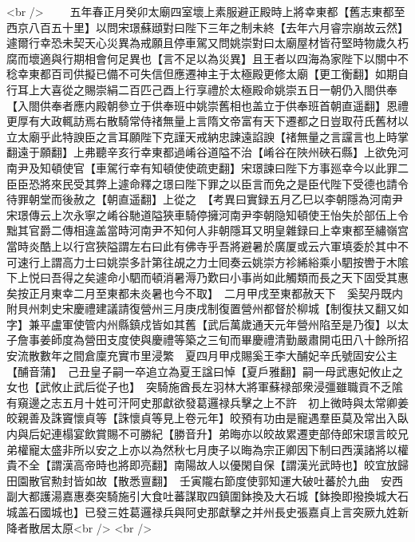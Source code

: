 <br />
　　五年春正月癸卯太廟四室壞上素服避正殿時上將幸東都【舊志東都至西京八百五十里】以問宋璟蘇頲對曰陛下三年之制未終【去年六月睿宗崩故云然】遽爾行幸恐未契天心災異為戒願且停車駕又問姚崇對曰太廟屋材皆苻堅時物歲久朽腐而壞適與行期相會何足異也【言不足以為災異】且王者以四海為家陛下以關中不稔幸東都百司供擬已備不可失信但應遷神主于太極殿更修太廟【更工衡翻】如期自行耳上大喜從之賜崇絹二百匹己酉上行享禮於太極殿命姚崇五日一朝仍入閤供奉【入閤供奉者應内殿朝參立于供奉班中姚崇舊相也盖立于供奉班首朝直遥翻】恩禮更厚有大政輒訪焉右散騎常侍禇無量上言隋文帝富有天下遷都之日豈取苻氏舊材以立太廟乎此特諛臣之言耳願陛下克謹天戒納忠諫遠諂諛【禇無量之言讜言也上時掌翻遠于願翻】上弗聽辛亥行幸東都過崤谷道隘不治【崤谷在陜州硤石縣】上欲免河南尹及知頓使官【車駕行幸有知頓使使疏吏翻】宋璟諫曰陛下方事廵幸今以此罪二臣臣恐將來民受其弊上遽命釋之璟曰陛下罪之以臣言而免之是臣代陛下受德也請令待罪朝堂而後赦之【朝直遥翻】上從之　【考異曰實録五月乙巳以李朝隱為河南尹宋璟傳云上次永寧之崤谷馳道隘狹車騎停擁河南尹李朝隐知頓使王怡失於部伍上令黜其官爵二傳相違盖當時河南尹不知何人非朝隱耳又明皇雜録曰上幸東都至繡嶺宫當時炎酷上以行宫狹隘謂左右曰此有佛寺乎吾將避暑於廣厦或云六軍填委於其中不可速行上謂高力士曰姚崇多計第往覘之力士囘奏云姚崇方袗絺綌乘小駟按轡于木隂下上悦曰吾得之矣遽命小駟而頓消暑溽乃歎曰小事尚如此觸類而長之天下固受其惠矣按正月東幸二月至東都未炎暑也今不取】　二月甲戌至東都赦天下　奚契丹既内附貝州刺史宋慶禮建議請復營州三月庚戌制復置營州都督於柳城【制復扶又翻又如字】兼平盧軍使管内州縣鎮戍皆如其舊【武后萬歲通天元年營州陷至是乃復】以太子詹事姜師度為營田支度使與慶禮等築之三旬而畢慶禮清勤嚴肅開屯田八十餘所招安流散數年之間倉廩充實市里浸繁　夏四月甲戍賜奚王李大酺妃辛氏號固安公主【酺音蒲】　己丑皇子嗣一卒追立為夏王諡曰悼【夏戶雅翻】嗣一母武惠妃攸止之女也【武攸止武后從子也】　突騎施酋長左羽林大將軍蘇禄部衆浸彊雖職貢不乏隂有窺邊之志五月十姓可汗阿史那獻欲發葛邏禄兵擊之上不許　初上微時與太常卿姜皎親善及誅竇懷貞等【誅懷貞等見上卷元年】皎預有功由是寵遇羣臣莫及常出入臥内與后妃連榻宴飲賞賜不可勝紀【勝音升】弟晦亦以皎故累遷吏部侍郎宋璟言皎兄弟權寵太盛非所以安之上亦以為然秋七月庚子以晦為宗正卿因下制曰西漢諸將以權貴不全【謂漢高帝時也將即亮翻】南陽故人以優閑自保【謂漢光武時也】皎宜放歸田園散官勲封皆如故【散悉亶翻】　壬寅隴右節度使郭知運大破吐蕃於九曲　安西副大都護湯嘉惠奏突騎施引大食吐蕃謀取四鎮圍鉢換及大石城【鉢換即撥換城大石城盖石國城也】已發三姓葛邏禄兵與阿史那獻擊之并州長史張嘉貞上言突厥九姓新降者散居太原<br />
<br />
